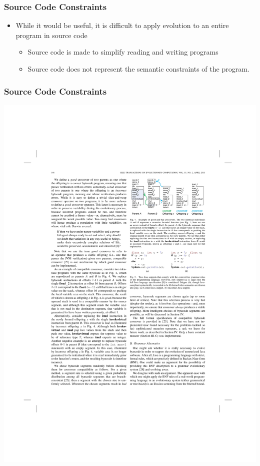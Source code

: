 \documentclass{beamer}
\begin{document}
\begin{frame}
	\frametitle{Source Code Constraints}
	\begin{itemize}
		\item While it would be useful, it is difficult to apply evolution to an entire program in source code
		\begin{itemize}
			\item Source code is made to simplify reading and writing programs
			\item Source code does not represent the semantic constraints of the program.
		\end{itemize}
	\end{itemize}		
	
	
\end{frame}

\begin{frame}
	\frametitle{Source Code Constraints}
   \includegraphics[width=1\textwidth]{Illustrations/semantics.pdf}
       \\
\end{frame}
\end{document}
